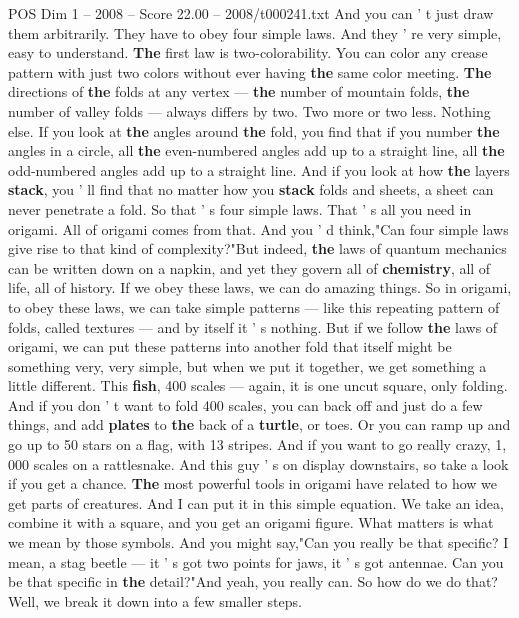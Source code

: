 \begin{textsample}{POS Dim 1 – 2008 – Score 22.00 – 2008/t000241.txt}
And you can ' t just draw them arbitrarily.
They have to obey four simple laws.
And they ' re very simple, easy to understand. \textbf{The} first law is two-colorability.
You can color any crease pattern with just two colors without ever having \textbf{the} same color meeting. \textbf{The} directions of \textbf{the} folds at any vertex — \textbf{the} number of mountain folds, \textbf{the} number of valley folds — always differs by two.
Two more or two less.
Nothing else.
If you look at \textbf{the} angles around \textbf{the} fold, you find that if you number \textbf{the} angles in a circle, all \textbf{the} even-numbered angles add up to a straight line, all \textbf{the} odd-numbered angles add up to a straight line.
And if you look at how \textbf{the} layers \textbf{stack}, you ' ll find that no matter how you \textbf{stack} folds and sheets, a sheet can never penetrate a fold.
So that ' s four simple laws.
That ' s all you need in origami.
All of origami comes from that.
And you ' d think,"Can four simple laws give rise to that kind of complexity?"But indeed, \textbf{the} laws of quantum mechanics can be written down on a napkin, and yet they govern all of \textbf{chemistry}, all of life, all of history.
If we obey these laws, we can do amazing things.
So in origami, to obey these laws, we can take simple patterns — like this repeating pattern of folds, called textures — and by itself it ' s nothing.
But if we follow \textbf{the} laws of origami, we can put these patterns into another fold that itself might be something very, very simple, but when we put it together, we get something a little different.
This \textbf{fish}, 400 scales — again, it is one uncut square, only folding.
And if you don ' t want to fold 400 scales, you can back off and just do a few things, and add \textbf{plates} to \textbf{the} back of a \textbf{turtle}, or toes.
Or you can ramp up and go up to 50 stars on a flag, with 13 stripes.
And if you want to go really crazy, 1, 000 scales on a rattlesnake.
And this guy ' s on display downstairs, so take a look if you get a chance. \textbf{The} most powerful tools in origami have related to how we get parts of creatures.
And I can put it in this simple equation.
We take an idea, combine it with a square, and you get an origami figure.
What matters is what we mean by those symbols.
And you might say,"Can you really be that specific?
I mean, a stag beetle — it ' s got two points for jaws, it ' s got antennae.
Can you be that specific in \textbf{the} detail?"And yeah, you really can.
So how do we do that?
Well, we break it down into a few smaller steps.

\end{textsample}
